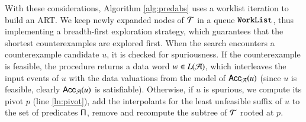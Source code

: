 \documentclass[10pt,conference,letterpaper,twocolumn]{IEEEtran}
\begin{document}
With these considerations, Algorithm \ref{alg:predabs} uses a worklist
iteration to build an ART. We keep newly expanded nodes of $\mathcal{T}$ in a
queue $\mathtt{WorkList}$, thus implementing a breadth-first exploration
strategy, which guarantees that the shortest counterexamples are
explored first. When the search encounters a counterexample candidate
$u$, it is checked for spuriousness. If the counterexample is
feasible, the procedure returns a data word $w \in L(\mathcal{A})$, which
interleaves the input events of $u$ with the data valuations from the
model of $\mathsf{Acc}_{\mathcal{A}}(u)$ (since $u$ is feasible, clearly
$\mathsf{Acc}_{\mathcal{A}}(u)$ is satisfiable). Otherwise, if $u$ is spurious, we
compute its pivot $p$ (line \ref{ln:pivot}), add the interpolants for
the least unfeasible suffix of $u$ to the set of predicates $\mathsf{\Pi}$,
remove and recompute the subtree of $\mathcal{T}$ rooted at $p$.
\end{document}

